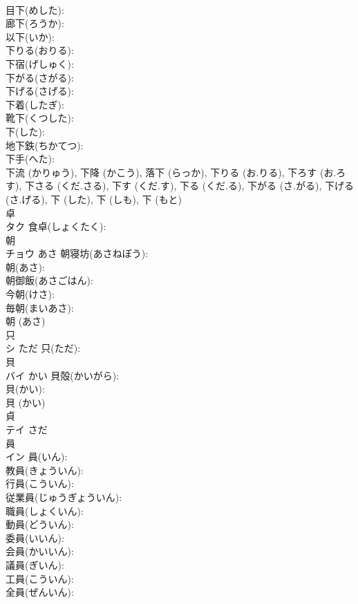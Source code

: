 \documentclass[8pt]{extreport}
\begin{document}
\begin{CJK}{UTF8}{min}
\\	目下(めした): 
\\	廊下(ろうか): 
\\	以下(いか): 
\\	下りる(おりる): 
\\	下宿(げしゅく): 
\\	下がる(さがる): 
\\	下げる(さげる): 
\\	下着(したぎ): 
\\	靴下(くつした): 
\\	下(した): 
\\	地下鉄(ちかてつ): 
\\	下手(へた): 
\\	下流 (かりゅう), 下降 (かこう), 落下 (らっか), 下りる (お.りる), 下ろす (お.ろす), 下さる (くだ.さる), 下す (くだ.す), 下る (くだ.る), 下がる (さ.がる), 下げる (さ.げる), 下 (した), 下 (しも), 下 (もと)
\\	卓			
\\	タク		食卓(しょくたく): 
\\	朝			
\\	チョウ	あさ	朝寝坊(あさねぼう): 
\\	朝(あさ): 
\\	朝御飯(あさごはん): 
\\	今朝(けさ): 
\\	毎朝(まいあさ): 
\\	朝 (あさ)
\\	只			
\\	シ	ただ	只(ただ): 
\\	貝			
\\	バイ	かい	貝殻(かいがら): 
\\	貝(かい): 
\\	貝 (かい)
\\	貞			
\\	テイ	さだ		
\\	員			
\\	イン		員(いん): 
\\	教員(きょういん): 
\\	行員(こういん): 
\\	従業員(じゅうぎょういん): 
\\	職員(しょくいん): 
\\	動員(どういん): 
\\	委員(いいん): 
\\	会員(かいいん): 
\\	議員(ぎいん): 
\\	工員(こういん): 
\\	全員(ぜんいん): 

\end{CJK}
\end{document}
